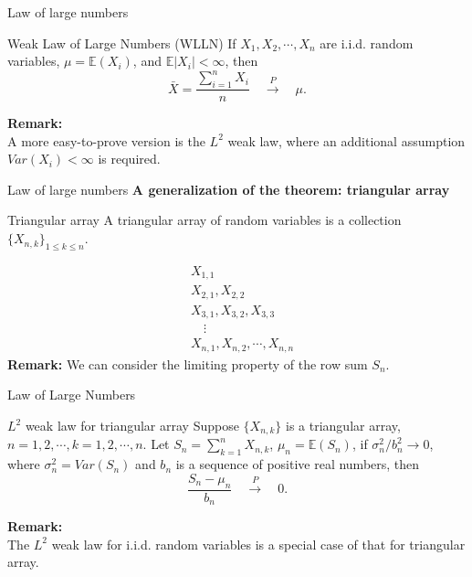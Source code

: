 \documentclass [aspectratio=169]{beamer}
\begin{document}
\begin{frame}{Law of large numbers}
    \begin{block}{Weak Law of Large Numbers (WLLN)}
    If $X_1, X_2, \cdots, X_n$ are i.i.d. random variables, $\mu = \mathbb{E}(X_i)$, and $ \mathbb{E}|X_i|< \infty$, then
    $$\bar{X} = \frac{\sum_{i = 1}^n X_i}{n} \quad \xrightarrow[]{P} \quad \mu.$$
    \end{block}
    \vspace{0.1in}
    \textbf{Remark:}\\
    A more easy-to-prove version is the $L^2$ weak law, where an additional assumption $Var(X_i) < \infty$ is required.\\
    \vspace{1in}
 \end{frame}

\begin{frame}{Law of large numbers}
\textbf{A generalization of the theorem: triangular array}
\begin{block}{Triangular array}
A triangular array of random variables is a collection $\{X_{n,k}\}_{1 \le k \le n}$. 
\end{block}
\begin{equation*}
    \begin{aligned}
    & X_{1,1} \\
    & X_{2,1}, X_{2,2}\\
    & X_{3,1}, X_{3,2}, X_{3,3}\\
    & \quad \vdots \\
    & X_{n, 1}, X_{n,2}, \cdots, X_{n,n}
    \end{aligned}
\end{equation*}
\vspace{0.1in}
\textbf{Remark:} We can consider the limiting property of the row sum $S_n$.
\end{frame}

\begin{frame}{Law of Large Numbers}
     \begin{block}{$L^2$ weak law for triangular array}
    Suppose $\{X_{n,k}\}$ is a triangular array, $n = 1, 2, \cdots, k =1, 2, \cdots, n$. Let $S_n = \sum_{k = 1}^n X_{n,k}$, $\mu_n = \mathbb{E}(S_n)$, if $\sigma_n^2/b_n^2 \to 0$, where $\sigma_n^2 = Var(S_n)$ and $b_n$ is a sequence of positive real numbers, then
    $$ \frac{S_n - \mu_n}{b_n} \quad \xrightarrow[]{P} \quad 0.$$
    \end{block}
    \vspace{0.1in}
    \textbf{Remark:}\\
    The $L^2$ weak law for i.i.d. random variables is a special case of that for triangular array.
    \vspace{0.7in}
\end{frame}
\end{document}
